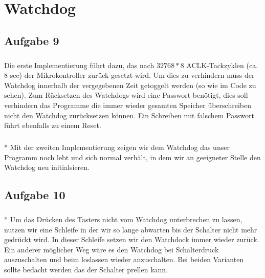 \chapter{Watchdog}

\section*{Aufgabe 9}

\paragraph*{}
Die erste Implementierung führt dazu, das nach $32768 * 8$ ACLK-Tackzyklen (ca. 8 sec) der Mikrokontroller zurück gesetzt wird. Um dies zu verhindern muss der Watchdog innerhalb der vergegebenen Zeit getoggelt werden (so wie im Code zu sehen). Zum Rücksetzen des Watchdogs wird eine Passwort benötigt, dies soll verhindern das Programme die immer wieder gesamten Speicher überschreiben nicht den Watchdog zurücksetzen können. Ein Schreiben mit falschem Passwort führt ebenfalls zu einem Reset. \\



\paragraph{}*
Mit der zweiten Implementierung zeigen wir dem Watchdog das unser Programm noch lebt und sich normal verhält, in dem wir an geeigneter Stelle den Watchdog neu initialsieren.

\section*{Aufgabe 10}

\paragraph{}*
Um das Drücken des Tasters nicht vom Watchdog unterbrechen zu lassen, nutzen wir eine Schleife in der wir so lange abwarten bis der Schalter nicht mehr gedrückt wird. In dieser Schleife setzen wir den Watchdock immer wieder zurück. Ein anderer möglicher Weg wäre es den Watchdog bei Schalterdruck auszuschalten und beim loslassen wieder anzuschalten. Bei beiden Varianten sollte bedacht werden das der Schalter prellen kann. \\



